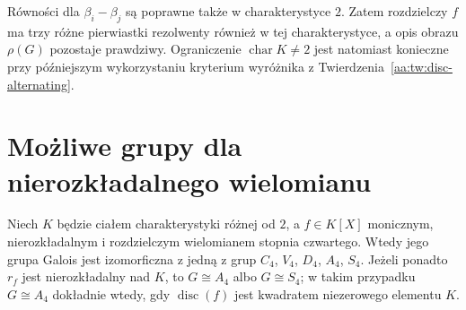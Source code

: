 \begin{uwaga}\label{aa:uw:quartic-char2}
Równości dla $\beta_i-\beta_j$ są poprawne także w charakterystyce
$2$. Zatem rozdzielczy $f$ ma trzy różne pierwiastki rezolwenty
również w tej charakterystyce, a opis obrazu $\rho(G)$ pozostaje
prawdziwy. Ograniczenie $\operatorname{char}K\ne2$ jest natomiast
konieczne przy późniejszym wykorzystaniu kryterium wyróżnika
z Twierdzenia~\ref{aa:tw:disc-alternating}.
\end{uwaga}

\section{Możliwe grupy dla nierozkładalnego wielomianu}
\begin{twierdzenie}\label{aa:tw:quartic-classification}
Niech $K$ będzie ciałem charakterystyki różnej od $2$,
a $f\in K[X]$ monicznym, nierozkładalnym i rozdzielczym
wielomianem stopnia czwartego. Wtedy jego grupa Galois
jest izomorficzna z jedną z grup $C_4$, $V_4$, $D_4$, $A_4$, $S_4$.
Jeżeli ponadto $r_f$ jest nierozkładalny nad $K$, to
$G\cong A_4$ albo $G\cong S_4$; w takim przypadku
$G\cong A_4$ dokładnie wtedy, gdy $\operatorname{disc}(f)$
jest kwadratem niezerowego elementu $K$.
\end{twierdzenie}
